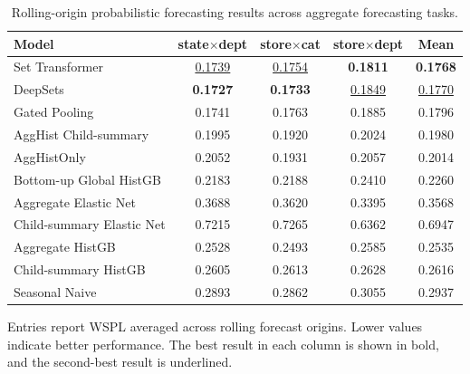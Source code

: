 \documentclass[12pt]{article}
\begin{document}
\begin{table}[H]
  \centering
  \caption{Rolling-origin probabilistic forecasting results across aggregate forecasting tasks.}
  \label{tab:rolling_quantile}
  \begin{threeparttable}
    \begin{tabular}{lcccc}
      \toprule
      Model                     & state$\times$dept  & store$\times$cat   & store$\times$dept  & Mean               \\
      \midrule
      Set Transformer                   & \underline{0.1739} & \underline{0.1754} & \textbf{0.1811}    & \textbf{0.1768}    \\
      DeepSets                  & \textbf{0.1727}    & \textbf{0.1733}    & \underline{0.1849} & \underline{0.1770} \\
      Gated Pooling                  & 0.1741             & 0.1763             & 0.1885             & 0.1796             \\
      AggHist Child-summary   & 0.1995             & 0.1920             & 0.2024             & 0.1980             \\
      AggHistOnly               & 0.2052             & 0.1931             & 0.2057             & 0.2014             \\
      Bottom-up Global HistGB  & 0.2183	     &0.2188	            &0.2410	             &0.2260             \\
      Aggregate Elastic Net     & 0.3688             & 0.3620             & 0.3395             & 0.3568             \\
      Child-summary Elastic Net & 0.7215             & 0.7265             & 0.6362             & 0.6947             \\
      Aggregate HistGB          & 0.2528             & 0.2493             & 0.2585             & 0.2535             \\
      Child-summary HistGB      & 0.2605             & 0.2613             & 0.2628             & 0.2616             \\
      Seasonal Naive            & 0.2893             & 0.2862             & 0.3055             & 0.2937             \\
      \bottomrule
    \end{tabular}
    \begin{tablenotes}
      \footnotesize \item Entries report WSPL averaged across rolling forecast origins. Lower values indicate better performance. The best result in each column is shown in bold, and the second-best result is underlined.
    \end{tablenotes}
  \end{threeparttable}
\end{table}
\end{document}

